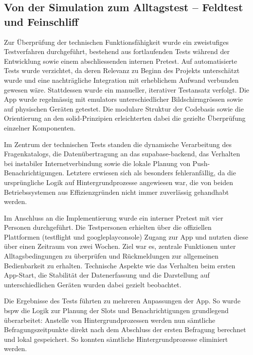 \subsection{Von der Simulation zum Alltagstest -- Feldtest und Feinschliff}
\label{sec:app_entwicklung_feldtest}

Zur Überprüfung der technischen Funktionsfähigkeit wurde ein zweistufiges Testverfahren durchgeführt, bestehend aus fortlaufenden Tests während der Entwicklung sowie einem abschliessenden internen Pretest. Auf automatisierte Tests wurde verzichtet, da deren Relevanz zu Beginn des Projekts unterschätzt wurde und eine nachträgliche Integration mit erheblichem Aufwand verbunden gewesen wäre. Stattdessen wurde ein manueller, iterativer Testansatz verfolgt. Die App wurde regelmässig mit \glspl{emulator} unterschiedlicher Bildschirmgrössen sowie auf physischen Geräten getestet. Die modulare Struktur der Codebasis sowie die Orientierung an den \gls{solid}-Prinzipien erleichterten dabei die gezielte Überprüfung einzelner Komponenten.

Im Zentrum der technischen Tests standen die dynamische Verarbeitung des Fragenkatalogs, die Datenübertragung an das \gls{supabase}-\gls{backend}, das Verhalten bei instabiler Internetverbindung sowie die lokale Planung von Push-Benachrichtigungen. Letztere erwiesen sich als besonders fehleranfällig, da die ursprüngliche Logik auf Hintergrundprozesse angewiesen war, die von beiden Betriebssystemen aus Effizienzgründen nicht immer zuverlässig gehandhabt werden.

Im Anschluss an die Implementierung wurde ein interner Pretest mit vier Personen durchgeführt. Die Testpersonen erhielten über die offiziellen Plattformen (\gls{testflight} und \gls{googleplayconsole}) Zugang zur App und nutzten diese über einen Zeitraum von zwei Wochen. Ziel war es, zentrale Funktionen unter Alltagsbedingungen zu überprüfen und Rückmeldungen zur allgemeinen Bedienbarkeit zu erhalten. Technische Aspekte wie das Verhalten beim ersten App-Start, die Stabilität der Datenerfassung und die Darstellung auf unterschiedlichen Geräten wurden dabei gezielt beobachtet.

Die Ergebnisse des Tests führten zu mehreren Anpassungen der App. So wurde \acrshort{bspw} die Logik zur Planung der Slots und Benachrichtigungen grundlegend überarbeitet: Anstelle von Hintergrundprozessen werden nun sämtliche Befragungszeitpunkte direkt nach dem Abschluss der ersten Befragung berechnet und lokal gespeichert. So konnten sämtliche Hintergrundprozesse eliminiert werden.

